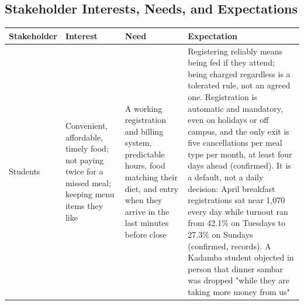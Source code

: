\documentclass[
  10pt,
  table]{article}
\newcounter{none} %
\begin{document}
\subsection{Stakeholder Interests, Needs, and Expectations}\label{stakeholder-interests-needs-and-expectations}

{\def\LTcaptype{none} %
\begin{longtable}[]{@{}
  >{\raggedright\arraybackslash}p{}
  >{\raggedright\arraybackslash}p{}
  >{\raggedright\arraybackslash}p{}
  >{\raggedright\arraybackslash}p{}@{}}
\toprule\noalign{}
\begin{minipage}[b]{\linewidth}\raggedright
\cellcolor{pblue}\color{white}\bfseries Stakeholder
\end{minipage} & \begin{minipage}[b]{\linewidth}\raggedright
\cellcolor{pblue}\color{white}\bfseries Interest
\end{minipage} & \begin{minipage}[b]{\linewidth}\raggedright
\cellcolor{pblue}\color{white}\bfseries Need
\end{minipage} & \begin{minipage}[b]{\linewidth}\raggedright
\cellcolor{pblue}\color{white}\bfseries Expectation
\end{minipage} \\
\midrule\noalign{}
\endhead
\bottomrule\noalign{}
\endlastfoot
Students & Convenient, affordable, timely food; not paying twice for a missed meal; keeping menu items they like & A working registration and billing system, predictable hours, food matching their diet, and entry when they arrive in the last minutes before close & Registering reliably means being fed if they attend; being charged regardless is a tolerated rule, not an agreed one. Registration is automatic and mandatory, even on holidays or off campus, and the only exit is five cancellations per meal type per month, at least four days ahead (confirmed). It is a default, not a daily decision: April breakfast registrations sat near 1,070 every day while turnout ran from 42.1\% on Tuesdays to 27.3\% on Sundays (confirmed, records). A Kadamba student objected in person that dinner sambar was dropped "while they are taking more money from us" \\

\end{longtable}}
\end{document}
